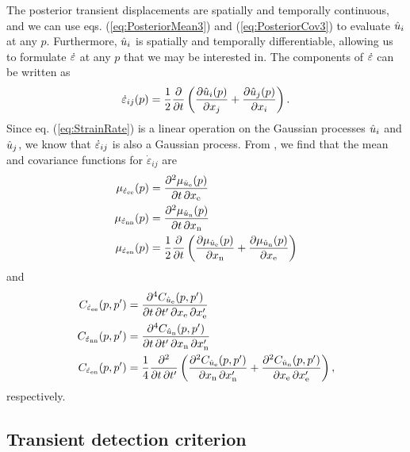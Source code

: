 \documentclass[extra,mreferee]{gji}
\begin{document}
The posterior transient displacements are spatially and temporally
continuous, and we can use eqs. (\ref{eq:PosteriorMean3}) and
(\ref{eq:PosteriorCov3}) to evaluate $\hat{u}_i$ at any $p$.
Furthermore, $\hat{u}_i$ is spatially and temporally differentiable,
allowing us to formulate $\dot\varepsilon$ at any $p$ that we may be
interested in. The components of $\dot\varepsilon$ can be written as
\begin{equation}\label{eq:StrainRate}
\dot\varepsilon_{ij}(p) = \frac{1}{2} \frac{\partial}{\partial t} 
                  \left(\frac{\partial \hat{u}_i(p)}{\partial x_j} +  
                        \frac{\partial \hat{u}_j(p)}{\partial x_i} \right).
\end{equation}
Since eq. (\ref{eq:StrainRate}) is a linear operation on the Gaussian
processes $\hat{u}_i$ and $\hat{u}_j$, we know that $\dot\varepsilon_{ij}$ is also
a Gaussian process. From \citet[sec. 10]{Papoulis1991}, we find that
the mean and covariance functions for $\dot{\varepsilon}_{ij}$ are
\begin{align}\label{eq:StrainMean}
\mu_{\dot\varepsilon_{\mathrm{e}\mathrm{e}}}(p) &= \frac{\partial^2 \mu_{\hat{u}_{\mathrm{e}}}(p)}{\partial t \, \partial x_{\mathrm{e}}} \\
\mu_{\dot\varepsilon_{\mathrm{n}\mathrm{n}}}(p) &= \frac{\partial^2 \mu_{\hat{u}_{\mathrm{n}}}(p)}{\partial t \, \partial x_{\mathrm{n}}} \\
\mu_{\dot\varepsilon_{\mathrm{e}\mathrm{n}}}(p) &= \frac{1}{2}\frac{\partial}{\partial t}\left(
                                    \frac{\partial \mu_{\hat{u}_{\mathrm{e}}}(p)}{\partial x_{\mathrm{n}}} + 
                                    \frac{\partial \mu_{\hat{u}_{\mathrm{n}}}(p)}{\partial x_{\mathrm{e}}} \right)
\end{align} 
and
\begin{align}\label{eq:StrainCov}
C_{\dot\varepsilon_{\mathrm{e}\mathrm{e}}}(p,p') &= \frac{\partial^4 C_{\hat{u}_{\mathrm{e}}}(p,p')}{\partial t \, \partial t' \, \partial x_{\mathrm{e}} \, \partial x'_{\mathrm{e}}} \\
C_{\dot\varepsilon_{\mathrm{n}\mathrm{n}}}(p,p') &= \frac{\partial^4 C_{\hat{u}_{\mathrm{n}}}(p,p')}{\partial t \, \partial t' \, \partial x_{\mathrm{n}} \, \partial x'_{\mathrm{n}}} \\
C_{\dot\varepsilon_{\mathrm{e}\mathrm{n}}}(p,p') &= \frac{1}{4} \frac{\partial^2}{\partial t \, \partial t'}\left(
                                      \frac{\partial^2 C_{\hat{u}_{\mathrm{e}}}(p,p')}{\partial x_{\mathrm{n}} \, \partial x'_{\mathrm{n}}} + 
                                      \frac{\partial^2 C_{\hat{u}_{\mathrm{n}}}(p,p')}{\partial x_{\mathrm{e}} \, \partial x'_{\mathrm{e}}} \right),
\end{align} 
respectively.

\subsection{Transient detection criterion}\label{sec:TransientDetection}
\end{document}
